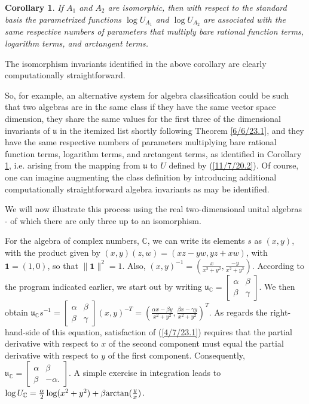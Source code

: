 \documentclass{amsart}
\numberwithin{equation}{section}
\newtheorem{corollary}[theorem]{Corollary}
\theoremstyle{definition}
\numberwithin{theorem}{section}
\begin{document}
\begin{corollary} \label{6/6/23.3} If $A_1$ and $A_2$ are isomorphic, then with respect to the standard basis the parametrized functions $\log U_{A_1}$ and $\log U_{A_2}$ are associated with the same respective numbers of parameters that multiply bare rational function terms, logarithm terms, and arctangent terms.
\end{corollary}

The isomorphism invariants identified in the above corollary are clearly computationally straightforward.

So, for example, an alternative system for algebra classification could be such that two algebras are in the same class if they have the same vector space dimension, they share the same values for the first three of the dimensional invariants of $\mathfrak{u}$ in the itemized list shortly following Theorem \ref{6/6/23.1}, and they have the same respective numbers of parameters multiplying bare rational function terms, logarithm terms, and arctangent terms, as identified in Corollary \ref{6/6/23.3}, i.e. arising from the mapping from $\mathfrak{u}$ to $ U$ defined by (\ref{11/7/20.2}).  
Of course, one can imagine augmenting the class definition by introducing additional computationally straightforward algebra invariants as may be identified.  

We will now illustrate this process using the real two-dimensional unital algebras - of which there are only three up to an isomorphism.

For the algebra of complex numbers, $\mathbb{C}$, we can write its elements $s$ as $(x,y)$, with the product given by $(x,y)(z,w) = (xz-yw, yz+xw)$, with $\mathbf{1}=(1,0)$, so that $\|\mathbf{1}\|^2=1$.  Also, $(x,y)^{-1} = (\frac{x}{x^2+y^2},\frac{-y}{x^2+y^2})$.  According to the program indicated earlier, we start out by writing  $\mathfrak{u}_\mathbb{C} = \left[\begin{array}{ccc}
 \alpha & \beta   \\ 
 \beta & \gamma    
\end{array}\right]$.  We then obtain  $\mathfrak{u}_\mathbb{C}s^{-1} = \left[\begin{array}{ccc}
 \alpha & \beta   \\ 
 \beta & \gamma    
\end{array}\right](x,y)^{-T} = \left(\frac{\alpha x - \beta y}{x^2+y^2}, \frac{\beta x - \gamma y}{x^2+y^2}\right)^T$.  As regards the right-hand-side of this equation, satisfaction of (\ref{4/7/23.1}) requires that the partial derivative with respect to $x$ of the second component must equal the partial derivative with respect to $y$ of the first component.  Consequently, $\mathfrak{u}_{\mathbb{C}} = \left[\begin{array}{ccc}
 \alpha & \beta   \\ 
 \beta & -\alpha.    
\end{array}\right]$.  A simple exercise in integration leads to $\log  U_{\mathbb{C}} = \frac{\alpha}{2}\log(x^2+y^2) + \beta{\rm arctan}(\frac{y}{x})$.
\end{document}
